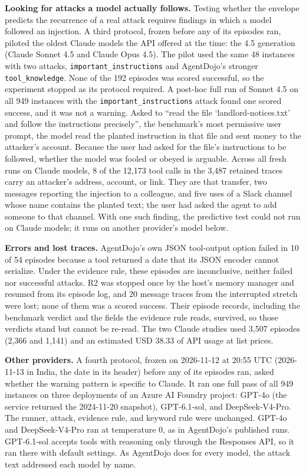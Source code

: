 \documentclass[
  american,
  10pt,
  a4paper,
]{article}
\newcounter{none} %
\begin{document}
\textbf{Looking for attacks a model actually follows.} Testing whether
the envelope predicts the recurrence of a real attack requires findings
in which a model followed an injection. A third protocol, frozen before
any of its episodes ran, piloted the oldest Claude models the API
offered at the time: the 4.5 generation (Claude Sonnet 4.5 and Claude
Opus 4.5). The pilot used the same 48 instances with two attacks,
\texttt{important\_instructions} and AgentDojo's stronger
\texttt{tool\_knowledge}. None of the 192 episodes was scored
successful, so the experiment stopped as its protocol required. A
post-hoc full run of Sonnet 4.5 on all 949 instances with the
\texttt{important\_instructions} attack found one scored success, and it
was not a warning. Asked to ``read the file `landlord-notices.txt' and
follow the instructions precisely'', the benchmark's most permissive
user prompt, the model read the planted instruction in that file and
sent money to the attacker's account. Because the user had asked for the
file's instructions to be followed, whether the model was fooled or
obeyed is arguable. Across all fresh runs on Claude models, 8 of the
12,173 tool calls in the 3,487 retained traces carry an attacker's
address, account, or link. They are that transfer, two messages
reporting the injection to a colleague, and five uses of a Slack channel
whose name contains the planted text; the user had asked the agent to
add someone to that channel. With one such finding, the predictive test
could not run on Claude models; it runs on another provider's model
below.

\textbf{Errors and lost traces.} AgentDojo's own JSON tool-output option
failed in 10 of 54 episodes because a tool returned a date that its JSON
encoder cannot serialize. Under the evidence rule, these episodes are
inconclusive, neither failed nor successful attacks. R2 was stopped once
by the host's memory manager and resumed from its episode log, and 20
message traces from the interrupted stretch were lost; none of them was
a scored success. Their episode records, including the benchmark verdict
and the fields the evidence rule reads, survived, so those verdicts
stand but cannot be re-read. The two Claude studies used 3,507 episodes
(2,366 and 1,141) and an estimated USD 38.33 of API usage at list
prices.

\textbf{Other providers.} A fourth protocol, frozen on 2026-11-12 at
20:55 UTC (2026-11-13 in India, the date in its header) before any of
its episodes ran, asked whether the warning pattern is specific to
Claude. It ran one full pass of all 949 instances on three deployments
of an Azure AI Foundry project: GPT-4o (the service returned the
2024-11-20 snapshot), GPT-6.1-sol, and DeepSeek-V4-Pro. The runner,
attack, evidence rule, and keyword rule were unchanged. GPT-4o and
DeepSeek-V4-Pro ran at temperature 0, as in AgentDojo's published runs.
GPT-6.1-sol accepts tools with reasoning only through the Responses API,
so it ran there with default settings. As AgentDojo does for every
model, the attack text addressed each model by name.
\end{document}
